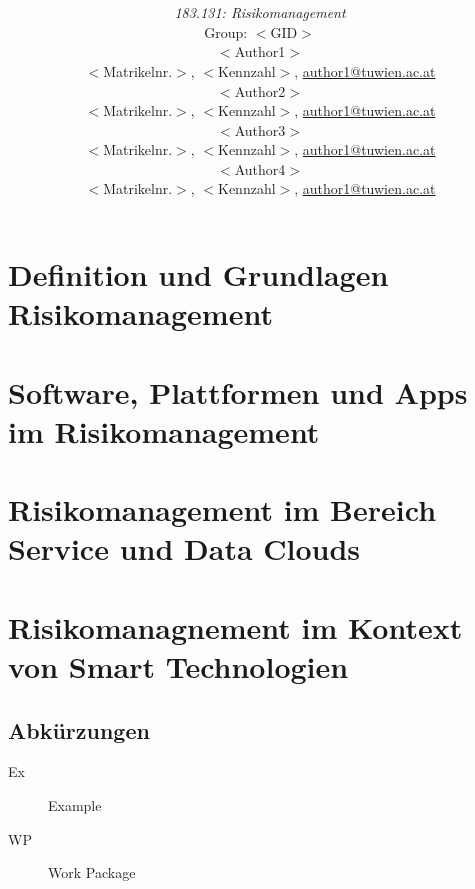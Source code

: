 \documentclass[a4paper,11pt]{article}
\title{\textbf{\sffamily\Huge \ShortTitle}\\ 
{}
\vspace{1cm}}
\author{
{\em 183.131: Risikomanagement} \vspace{1cm} \\
Group: $<$GID$>$\bigskip \\
$<$Author1$>$ \\ {\small $<$Matrikelnr.$>$, $<$Kennzahl$>$, \href{mailto:author1@tuwien.ac.at}{author1@tuwien.ac.at}}\\
$<$Author2$>$ \\ {\small $<$Matrikelnr.$>$, $<$Kennzahl$>$, \href{mailto:author2@tuwien.ac.at}{author1@tuwien.ac.at}}\\
$<$Author3$>$ \\ {\small $<$Matrikelnr.$>$, $<$Kennzahl$>$, \href{mailto:author3@tuwien.ac.at}{author1@tuwien.ac.at}}\\
$<$Author4$>$ \\ {\small $<$Matrikelnr.$>$, $<$Kennzahl$>$, \href{mailto:author4@tuwien.ac.at}{author1@tuwien.ac.at}}\\ 
\vspace{4cm}
}
\begin{document}
\begin{titlepage}
\maketitle

\end{titlepage}


\thispagestyle{empty}
\tableofcontents
\pagebreak

\setcounter{page}{1}


\section{Definition und Grundlagen Risikomanagement}
\label{sect:grundlagen}


\section{Software, Plattformen und Apps im Risikomanagement}
\label{sect:software}



\section{Risikomanagement im Bereich Service und Data Clouds}
\label{sect:clouds}



\section{Risikomanagnement im Kontext von Smart Technologien}
\label{sect:relevance}



\begin{appendix}

\pagebreak

{}




\pagebreak

\section*{Abkürzungen}
 
 \begin{description}
  \item[Ex] Example
  \item[WP] Work Package
 \end{description}

\end{appendix}
\end{document}
